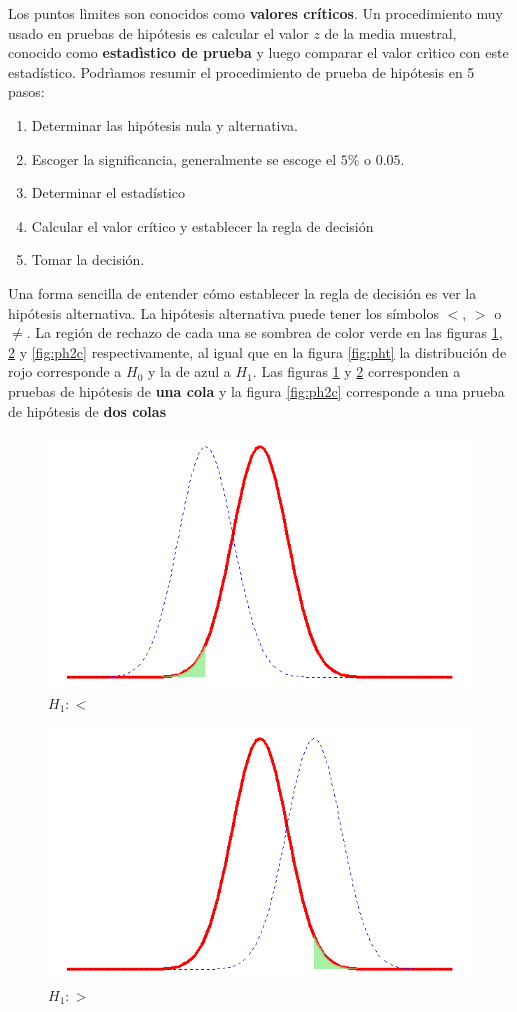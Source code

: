 \documentclass[]{book}
\providecommand{\tightlist}{%
  \setlength{\itemsep}{0pt}\setlength{\parskip}{0pt}}
\begin{document}
Los puntos lìmites son conocidos como \textbf{valores críticos}. Un
procedimiento muy usado en pruebas de hipótesis es calcular el valor
\(z\) de la media muestral, conocido como \textbf{estadìstico de prueba}
y luego comparar el valor crìtico con este estadístico. Podrìamos
resumir el procedimiento de prueba de hipótesis en 5 pasos:

\begin{enumerate}
\def\labelenumi{\arabic{enumi}.}
\tightlist
\item
  Determinar las hipótesis nula y alternativa.
\item
  Escoger la significancia, generalmente se escoge el \(5\%\) o
  \(0.05\).
\item
  Determinar el estadístico
\item
  Calcular el valor crítico y establecer la regla de decisión
\item
  Tomar la decisión.
\end{enumerate}

Una forma sencilla de entender cómo establecer la regla de decisión es
ver la hipótesis alternativa. La hipótesis alternativa puede tener los
símbolos \(<\), \(>\) o \(\neq\). La región de rechazo de cada una se
sombrea de color verde en las figuras \ref{fig:phless}, \ref{fig:phmore}
y \ref{fig:ph2c} respectivamente, al igual que en la figura
\ref{fig:pht} la distribución de rojo corresponde a \(H_0\) y la de azul
a \(H_1\). Las figuras \ref{fig:phless} y \ref{fig:phmore} corresponden
a pruebas de hipótesis de \textbf{una cola} y la figura \ref{fig:ph2c}
corresponde a una prueba de hipótesis de \textbf{dos colas}

\begin{figure}[h]

{\centering \includegraphics[width=0.5\linewidth]{phless} 

}

\caption{$H_1:<$}\label{fig:phless}
\end{figure}

\begin{figure}[h]

{\centering \includegraphics[width=0.5\linewidth]{phmore} 

}

\caption{$H_1:>$}\label{fig:phmore}
\end{figure}
\end{document}
